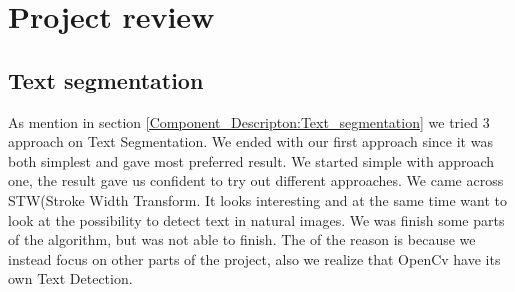 \documentclass[11pt,a4paper,UKenglish]{article}
\begin{document}
\newpage
{}



\newpage
\section{Project review}
\label{sec:Project review}

\subsection{Text segmentation}
As mention in section \ref{Component_Descripton:Text_segmentation} we tried 3 approach on Text Segmentation. We ended with our first approach since it was both simplest and gave most preferred result. We started simple with approach one, the result gave us confident to try out different approaches. We came across STW(Stroke Width Transform. It looks interesting and at the same time want to look at the possibility to detect text in natural images. We was finish some parts of the algorithm, but was not able to finish. The of the reason is because we instead focus on other parts of the project, also we realize that OpenCv have its own Text Detection.
\end{document}
